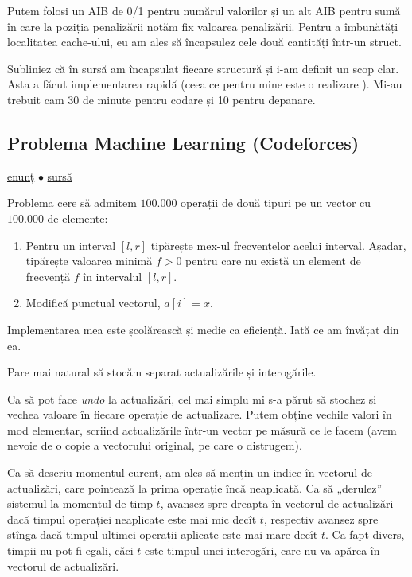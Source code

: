 \documentclass[../main.tex]{subfiles}
\begin{document}
Putem folosi un AIB de 0/1 pentru numărul valorilor și un alt AIB pentru sumă în care la poziția penalizării notăm fix valoarea penalizării. Pentru a îmbunătăți localitatea cache-ului, eu am ales să încapsulez cele două cantități într-un struct.

Subliniez că în sursă am încapsulat fiecare structură și i-am definit un scop clar. Asta a făcut implementarea rapidă (ceea ce pentru mine este o realizare ). Mi-au trebuit cam 30 de minute pentru codare și 10 pentru depanare.

\subsection{Problema Machine Learning (Codeforces)}
\label{problem:machine-learning}

\href{https://codeforces.com/contest/940/problem/F}{enunț}
$\bullet$
\hyperref[code:machine-learning]{sursă}

Problema cere să admitem $100.000$ operații de două tipuri pe un vector cu $100.000$ de elemente:

\begin{enumerate}
  \item Pentru un interval $[l,r]$ tipărește mex-ul frecvențelor acelui interval. Așadar, tipărește valoarea minimă $f > 0$ pentru care nu există un element de frecvență $f$ în intervalul $[l,r]$.
  \item Modifică punctual vectorul, $a[i] = x$.
\end{enumerate}

Implementarea mea este școlărească și medie ca eficiență. Iată ce am învățat din ea.

Pare mai natural să stocăm separat actualizările și interogările.

Ca să pot face \textit{undo} la actualizări, cel mai simplu mi s-a părut să stochez și vechea valoare în fiecare operație de actualizare. Putem obține vechile valori în mod elementar, scriind actualizările într-un vector pe măsură ce le facem (avem nevoie de o copie a vectorului original, pe care o distrugem).

Ca să descriu  momentul curent, am ales să mențin un indice în vectorul de actualizări, care pointează la prima operație încă neaplicată. Ca să „derulez” sistemul la momentul de timp $t$, avansez spre dreapta în vectorul de actualizări dacă timpul operației neaplicate este mai mic decît $t$, respectiv avansez spre stînga dacă timpul ultimei operații aplicate este mai mare decît $t$. Ca fapt divers, timpii nu pot fi egali, căci $t$ este timpul unei interogări, care nu va apărea în vectorul de actualizări.
\end{document}
